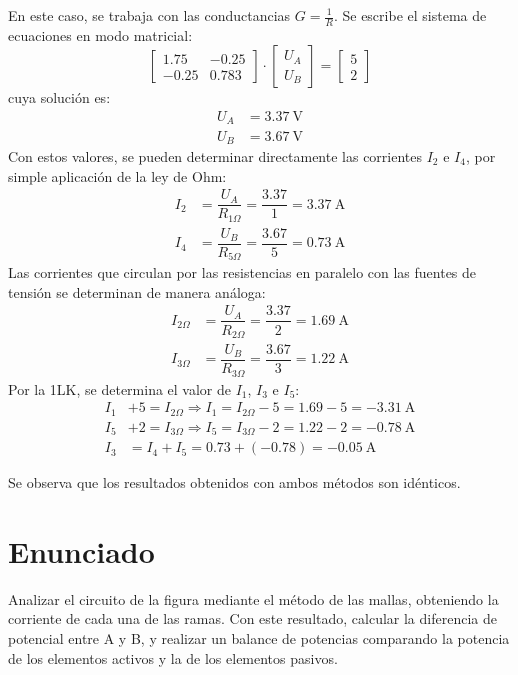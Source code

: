 En este caso, se trabaja con las conductancias $G=\frac{1}{R}$. Se
escribe el sistema de ecuaciones en modo matricial:
\begin{equation*}
  \begin{bmatrix}
    1.75 & - 0.25\\
    -0.25 & 0.783
  \end{bmatrix} \cdot%
  \begin{bmatrix}
    U_A\\
    U_B
  \end{bmatrix} = %
  \begin{bmatrix}
    5\\
    2
  \end{bmatrix}
\end{equation*}
cuya solución es:
\begin{align*}
  U_A&=\qty{3.37}{\volt}\\
  U_B&=\qty{3.67}{\volt}
\end{align*}
Con estos valores, se pueden determinar directamente las corrientes
$I_2$ e $I_4$, por simple aplicación de la ley de Ohm:
\begin{align*}
  I_2&=\dfrac{U_A}{R_{1\Omega}}=\dfrac{3.37}{1}=\qty{3.37}{\ampere}\\
  I_4&=\dfrac{U_B}{R_{5\Omega}}=\dfrac{3.67}{5}=\qty{0.73}{\ampere}
\end{align*}
Las corrientes que circulan por las resistencias en paralelo con las
fuentes de tensión se determinan de manera análoga:
\begin{align*}
  I_{2\Omega}&=\dfrac{U_A}{R_{2\Omega}}=\dfrac{3.37}{2}=\qty{1.69}{\ampere}\\
  I_{3\Omega}&=\dfrac{U_B}{R_{3\Omega}}=\dfrac{3.67}{3}=\qty{1.22}{\ampere}
\end{align*}
Por la 1LK, se determina el valor de $I_1$, $I_3$ e $I_5$:
\begin{align*}
  I_1&+5=I_{2\Omega}\Rightarrow I_1=I_{2\Omega}-5=1.69-5=\qty{-3.31}{\ampere}\\
  I_5&+2=I_{3\Omega}\Rightarrow I_5=I_{3\Omega}-2=1.22-2=\qty{-0.78}{\ampere}\\
  I_3&=I_4+I_5=0.73+(-0.78)=\qty{-0.05}{\ampere}
\end{align*}

Se observa que los resultados obtenidos con ambos métodos son
idénticos.

\section{Enunciado}
Analizar el circuito de la figura mediante el método de las mallas,
obteniendo la corriente de cada una de las ramas. Con este resultado,
calcular la diferencia de potencial entre A y B, y realizar un balance
de potencias comparando la potencia de los elementos activos y la de
los elementos pasivos.


